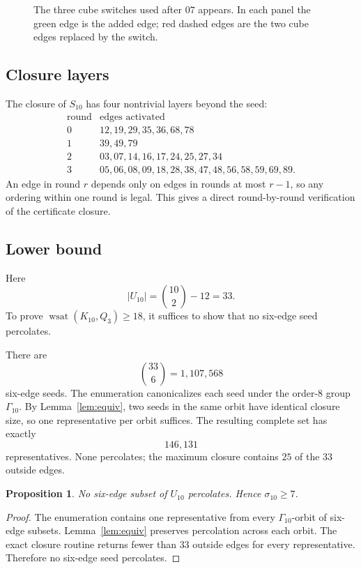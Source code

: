 \documentclass[11pt]{article}
\numberwithin{equation}{section}
\newtheorem{proposition}[theorem]{Proposition}
\newcommand{\wsat}{\operatorname{wsat}}
\begin{document}
\begin{figure}[t]
\centering
\resizebox{0.96\linewidth}{!}{}
\caption{The three cube switches used after $07$ appears. In each panel the green edge is the added edge; red dashed edges are the two cube edges replaced by the switch.}
\label{fig:switches}
\end{figure}

\subsection{Closure layers}
The closure of $S_{10}$ has four nontrivial layers beyond the seed:
\[
\begin{array}{c|l}
\text{round}&\text{edges activated}\\ \hline
0&12,19,29,35,36,68,78\\
1&39,49,79\\
2&03,07,14,16,17,24,25,27,34\\
3&05,06,08,09,18,28,38,47,48,56,58,59,69,89.
\end{array}
\tag{5.4}
\]
An edge in round $r$ depends only on edges in rounds at most $r-1$, so any ordering within one round is legal. This gives a direct round-by-round verification of the certificate closure.

\subsection{Lower bound}
Here
\[
|U_{10}|=\binom{10}{2}-12=33.
\]
To prove $\wsat(K_{10},Q_3)\ge18$, it suffices to show that no six-edge seed percolates.

There are
\[
\binom{33}{6}=1,107,568
\]
six-edge seeds. The enumeration canonicalizes each seed under the order-$8$ group $\Gamma_{10}$. By Lemma~\ref{lem:equiv}, two seeds in the same orbit have identical closure size, so one representative per orbit suffices. The resulting complete set has exactly
\[
146,131
\]
representatives. None percolates; the maximum closure contains $25$ of the $33$ outside edges.

\begin{proposition}\label{prop:n10lower}
No six-edge subset of $U_{10}$ percolates. Hence $\sigma_{10}\ge7$.
\end{proposition}

\begin{proof}
The enumeration contains one representative from every $\Gamma_{10}$-orbit of six-edge subsets. Lemma~\ref{lem:equiv} preserves percolation across each orbit. The exact closure routine returns fewer than $33$ outside edges for every representative. Therefore no six-edge seed percolates.
\end{proof}
\end{document}
